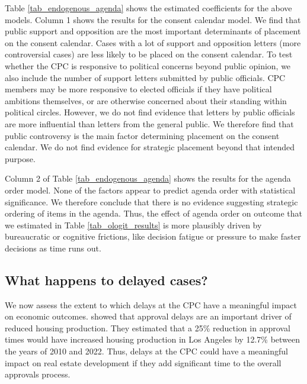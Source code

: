 Table \ref{tab_endogenous_agenda} shows the estimated coefficients for the above models. Column 1 shows the results for the consent calendar model. We find that public support and opposition are the most important determinants of placement on the consent calendar. Cases with a lot of support and opposition letters (more controversial cases) are less likely to be placed on the consent calendar. To test whether the CPC is responsive to political concerns beyond public opinion, we also include the number of support letters submitted by public officials. CPC members may be more responsive to elected officials if they have political ambitions themselves, or are otherwise concerned about their standing within political circles. However, we do not find evidence that letters by public officials are more influential than letters from the general public. We therefore find that public controversy is the main factor determining placement on the consent calendar. We do not find evidence for strategic placement beyond that intended purpose.

Column 2 of Table \ref{tab_endogenous_agenda} shows the results for the agenda order model. None of the factors appear to predict agenda order with statistical significance. We therefore conclude that there is no evidence suggesting strategic ordering of items in the agenda. Thus, the effect of agenda order on outcome that we estimated in Table \ref{tab_ologit_results} is more plausibly driven by bureaucratic or cognitive frictions, like decision fatigue or pressure to make faster decisions as time runs out.

\subsection{What happens to delayed cases?}

We now assess the extent to which delays at the CPC have a meaningful impact on economic outcomes. \citet{gabrielkung2025} showed that approval delays are an important driver of reduced housing production. They estimated that a 25\% reduction in approval times would have increased housing production in Los Angeles by 12.7\% between the years of 2010 and 2022. Thus, delays at the CPC could have a meaningful impact on real estate development if they add significant time to the overall approvals process. 

